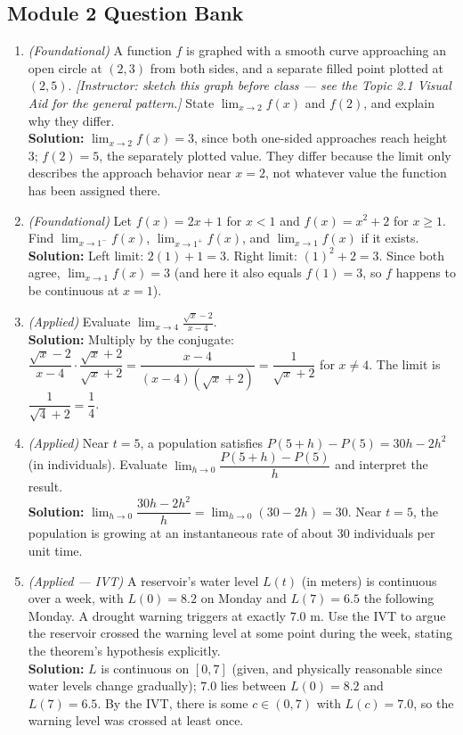 \documentclass[11pt]{article}
\begin{document}
\subsection*{Module 2 Question Bank}
\begin{enumerate}[leftmargin=*]
  \item \textit{(Foundational)} A function $f$ is graphed with a smooth curve approaching an open circle at $(2,3)$ from both sides, and a separate filled point plotted at $(2,5)$. \textit{[Instructor: sketch this graph before class --- see the Topic 2.1 Visual Aid for the general pattern.]} State $\displaystyle\lim_{x\to 2}f(x)$ and $f(2)$, and explain why they differ. \\
  \textbf{Solution:} $\displaystyle\lim_{x\to 2}f(x)=3$, since both one-sided approaches reach height $3$; $f(2)=5$, the separately plotted value. They differ because the limit only describes the approach behavior near $x=2$, not whatever value the function has been assigned there.

  \item \textit{(Foundational)} Let $f(x)=2x+1$ for $x<1$ and $f(x)=x^2+2$ for $x\ge 1$. Find $\displaystyle\lim_{x\to 1^-}f(x)$, $\displaystyle\lim_{x\to 1^+}f(x)$, and $\displaystyle\lim_{x\to 1}f(x)$ if it exists. \\
  \textbf{Solution:} Left limit: $2(1)+1=3$. Right limit: $(1)^2+2=3$. Since both agree, $\displaystyle\lim_{x\to 1}f(x)=3$ (and here it also equals $f(1)=3$, so $f$ happens to be continuous at $x=1$).

  \item \textit{(Applied)} Evaluate $\displaystyle\lim_{x\to 4}\frac{\sqrt{x}-2}{x-4}$. \\
  \textbf{Solution:} Multiply by the conjugate: $\dfrac{\sqrt{x}-2}{x-4}\cdot\dfrac{\sqrt{x}+2}{\sqrt{x}+2}=\dfrac{x-4}{(x-4)(\sqrt{x}+2)}=\dfrac{1}{\sqrt{x}+2}$ for $x\ne 4$. The limit is $\dfrac{1}{\sqrt{4}+2}=\dfrac14$.

  \item \textit{(Applied)} Near $t=5$, a population satisfies $P(5+h)-P(5)=30h-2h^2$ (in individuals). Evaluate $\displaystyle\lim_{h\to 0}\dfrac{P(5+h)-P(5)}{h}$ and interpret the result. \\
  \textbf{Solution:} $\displaystyle\lim_{h\to 0}\dfrac{30h-2h^2}{h}=\lim_{h\to 0}(30-2h)=30$. Near $t=5$, the population is growing at an instantaneous rate of about $30$ individuals per unit time.

  \item \textit{(Applied --- IVT)} A reservoir's water level $L(t)$ (in meters) is continuous over a week, with $L(0)=8.2$ on Monday and $L(7)=6.5$ the following Monday. A drought warning triggers at exactly $7.0$ m. Use the IVT to argue the reservoir crossed the warning level at some point during the week, stating the theorem's hypothesis explicitly. \\
  \textbf{Solution:} $L$ is continuous on $[0,7]$ (given, and physically reasonable since water levels change gradually); $7.0$ lies between $L(0)=8.2$ and $L(7)=6.5$. By the IVT, there is some $c\in(0,7)$ with $L(c)=7.0$, so the warning level was crossed at least once.


\end{enumerate}
\end{document}
